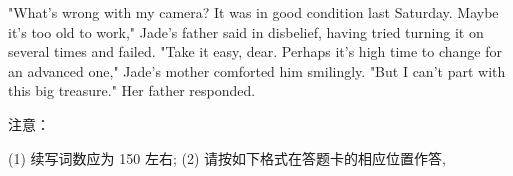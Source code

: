 \documentclass{英语试卷}
\begin{document}
\par "What's wrong with my camera? It was in good condition last Saturday. Maybe it's too old to work," Jade's father said in disbelief, having tried turning it on several times and failed. "Take it easy, dear. Perhaps it's high time to change for an advanced one," Jade's mother comforted him smilingly. "But I can't part with this big treasure." Her father responded.\par
\par 注意：\par
\par (1) 续写词数应为 150 左右; (2) 请按如下格式在答题卡的相应位置作答,\par
{}
\end{document}
